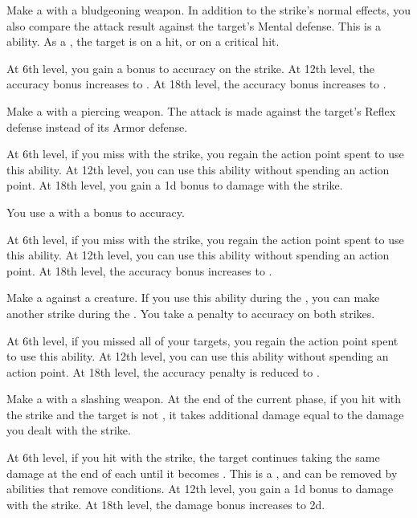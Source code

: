 {             Make a  with a bludgeoning weapon.
            In addition to the strike's normal effects, you also compare the attack result against the target's Mental defense.
            This is a  ability.
            As a , the target is \dazed on a hit, or \stunned on a critical hit.
            \par At 6th level, you gain a  bonus to accuracy on the strike.
            At 12th level, the accuracy bonus increases to .
            At 18th level, the accuracy bonus increases to .

             Make a  with a piercing weapon.
            The attack is made against the target's Reflex defense instead of its Armor defense.
            \par At 6th level, if you miss with the strike, you regain the action point spent to use this ability.
            At 12th level, you can use this ability without spending an action point.
            At 18th level, you gain a \plus1d bonus to damage with the strike.

             You use a  with a  bonus to accuracy.
            \par At 6th level, if you miss with the strike, you regain the action point spent to use this ability.
            At 12th level, you can use this ability without spending an action point.
            At 18th level, the accuracy bonus increases to .

             Make a  against a creature.
            If you use this ability during the , you can make another strike during the .
            You take a  penalty to accuracy on both strikes.
            \par At 6th level, if you missed all of your targets, you regain the action point spent to use this ability.
            At 12th level, you can use this ability without spending an action point.
            At 18th level, the accuracy penalty is reduced to .

             Make a  with a slashing weapon.
            At the end of the current phase, if you hit with the strike and the target is not , it takes additional damage equal to the damage you dealt with the strike.
            \par At 6th level, if you hit with the strike, the target continues taking the same damage at the end of each  until it becomes .
            This is a , and can be removed by abilities that remove conditions.
            At 12th level, you gain a \plus1d bonus to damage with the strike.
            At 18th level, the damage bonus increases to \plus2d.

}

